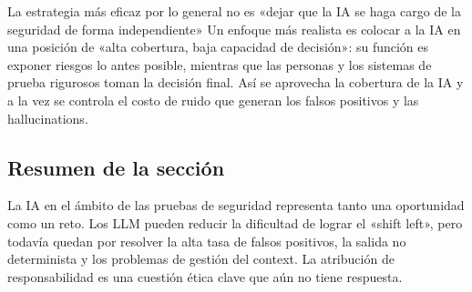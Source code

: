 \begin{knowledgebox}{La estrategia más eficaz por lo general no es «dejar que la IA se haga cargo de la seguridad de forma independiente»}
Un enfoque más realista es colocar a la IA en una posición de «alta cobertura, baja capacidad de decisión»: su función es exponer riesgos lo antes posible, mientras que las personas y los sistemas de prueba rigurosos toman la decisión final. Así se aprovecha la cobertura de la IA y a la vez se controla el costo de ruido que generan los falsos positivos y las hallucinations.
\end{knowledgebox}

\subsection{Resumen de la sección}

La IA en el ámbito de las pruebas de seguridad representa tanto una oportunidad como un reto. Los LLM pueden reducir la dificultad de lograr el «shift left», pero todavía quedan por resolver la alta tasa de falsos positivos, la salida no determinista y los problemas de gestión del context. La atribución de responsabilidad es una cuestión ética clave que aún no tiene respuesta.

